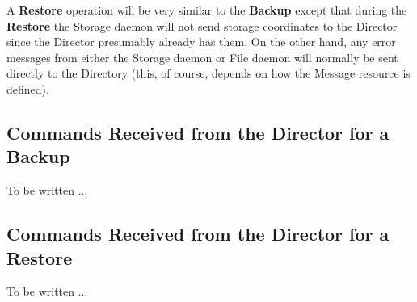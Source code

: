 A {\bf Restore} operation will be very similar to the {\bf Backup} except that
during the {\bf Restore} the Storage daemon will not send storage coordinates
to the Director since the Director presumably already has them. On the other
hand, any error messages from either the Storage daemon or File daemon will
normally be sent directly to the Directory (this, of course, depends on how
the Message resource is defined). 

\subsection*{Commands Received from the Director for a Backup}

To be written ... 

\subsection*{Commands Received from the Director for a Restore}

To be written ... 
